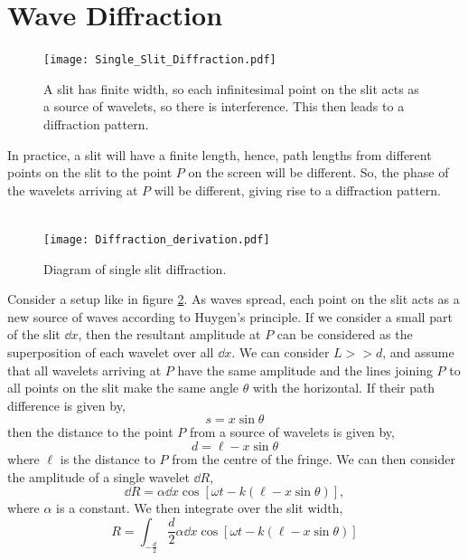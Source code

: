 \documentclass{book}
\begin{document}
\section{Wave Diffraction}
\begin{figure}
	\centering
	\texttt{[image: Single\_Slit\_Diffraction.pdf]}
	\caption{A slit has finite width, so each infinitesimal point on the slit acts as a source of wavelets, so there is interference. This then leads to a diffraction pattern.}
	\label{single slit diff}
\end{figure}
In practice, a slit will have a finite length, hence, path lengths from different points on the slit to the point $P$ on the screen will be different. So, the phase of the wavelets arriving at $P$ will be different, giving rise to a diffraction pattern. 
\\\\
\begin{figure}
	\centering
	\texttt{[image: Diffraction\_derivation.pdf]}
	\caption{Diagram of single slit diffraction.}
	\label{single slit derivation}
\end{figure}\noindent
Consider a setup like in figure \ref{single slit derivation}. As waves spread, each point on the slit acts as a new source of waves according to Huygen's principle. If we consider a small part of the slit $\dd{x}$, then the resultant amplitude at $P$ can be considered as the superposition of each wavelet over all $\dd{x}$. We can consider $L >> d$, and assume that all wavelets arriving at $P$ have the same amplitude and the lines joining $P$ to all points on the slit make the same angle $\theta$ with the horizontal. If their path difference is given by,
\begin{equation}
	s = x\sin\theta
\end{equation} 
then the distance to the point $P$ from a source of wavelets is given by,
\begin{equation}
	d = \ell - x\sin\theta
\end{equation}
where $\ell$ is the distance to $P$ from the centre of the fringe. 
We can then consider the amplitude of a single wavelet $\dd{R}$,
\begin{equation}
	\dd{R} = \alpha \dd{x} \cos\left[\omega t -k(\ell-x\sin\theta)\right],
\end{equation} 
where $\alpha$ is a constant. We then integrate over the slit width,
\begin{equation}
	R = \int_{-\frac{d}{2}}{\frac{d}{2}} \alpha \dd{x} \cos\left[\omega t -k(\ell-x\sin\theta)\right]
\end{equation}
\end{document}
